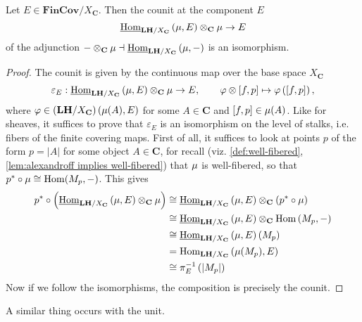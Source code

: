 \begin{proposition}
\label{prop:the counit of the adjunction is an isomorphism}
Let $E \in \mathbf{FinCov}/X_{\mathbf{C}}$. Then the counit at the component $E$
\[ \underline{\operatorname{Hom}}_{\mathbf{LH}/X_{\mathbf{C}}}\left(\operatorname{\mu}, E\right) \otimes_{\mathbf{C}} \operatorname{\mu} \to E \]
of the adjunction $- \otimes_{\mathbf{C}} \operatorname{\mu} \dashv \underline{\operatorname{Hom}}_{\mathbf{LH}/X_{\mathbf{C}}}\left(\operatorname{\mu},-\right)$ is an isomorphism.
\end{proposition}
\begin{proof}
The counit is given by the continuous map over the base space $X_{\mathbf{C}}$
\[ \varepsilon_E : \underline{\operatorname{Hom}}_{\mathbf{LH}/X_{\mathbf{C}}}\left(\operatorname{\mu}, E\right) \otimes_{\mathbf{C}} \operatorname{\mu} \to E, \qquad \varphi \otimes [f,p] \mapsto \varphi\left([f,p]\right), \]
where $\varphi \in \left(\mathbf{LH}/X_{\mathbf{C}}\right)(\operatorname{\mu}(A),E)$ for some $A \in \mathbf{C}$ and $[f,p] \in \operatorname{\mu}(A)$. Like for sheaves, it suffices to prove that $\varepsilon_E$ is an isomorphism on the level of stalks, i.e. fibers of the finite covering maps. First of all, it suffices to look at points $p$ of the form $p = |A|$ for some object $A \in \mathbf{C}$, for recall (viz. \cref{def:well-fibered}, \cref{lem:alexandroff implies well-fibered}) that $\operatorname{\mu}$ is well-fibered, so that $p^* \circ \operatorname{\mu} \cong \operatorname{Hom}(M_p,-)$. This gives
\begin{align*}
p^* \circ \left( \underline{\operatorname{Hom}}_{\mathbf{LH}/X_{\mathbf{C}}}\left(\operatorname{\mu}, E\right) \otimes_{\mathbf{C}} \operatorname{\mu} \right) 
&\cong \underline{\operatorname{Hom}}_{\mathbf{LH}/X_{\mathbf{C}}}\left(\operatorname{\mu}, E\right) \otimes_{\mathbf{C}} \left( p^* \circ \operatorname{\mu} \right) 
\\
&\cong \underline{\operatorname{Hom}}_{\mathbf{LH}/X_{\mathbf{C}}}\left(\operatorname{\mu}, E\right) \otimes_{\mathbf{C}} \operatorname{Hom}\left(M_p,-\right)
\\
&\cong \underline{\operatorname{Hom}}_{\mathbf{LH}/X_{\mathbf{C}}}\left(\operatorname{\mu}, E\right) \left(M_p \right) \\
&= \operatorname{Hom}_{\mathbf{LH}/X_{\mathbf{C}}}\left(\operatorname{\mu}(M_p), E\right) \\
&\cong \pi_E^{-1}\left(|M_p| \right)
\end{align*}
Now if we follow the isomorphisms, the composition is precisely the counit.
\end{proof}

A similar thing occurs with the unit.

